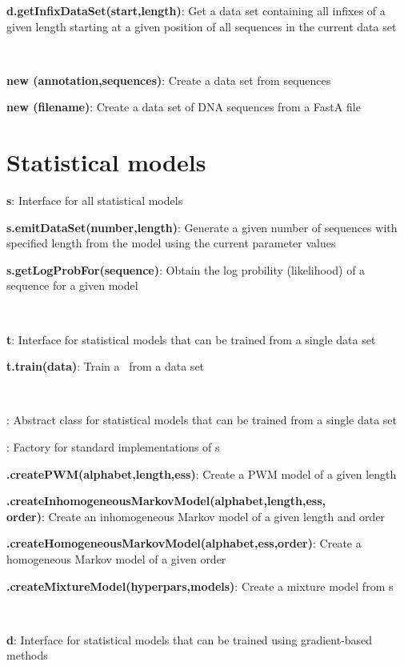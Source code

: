 \documentclass[10pt]{scrartcl}
\newcommand{\entry}[3]{{\bfseries #1#2}: #3}
\begin{document}
\begin{flushleft}
\entry{d}{.getInfixDataSet(start,length)}{Get a data set containing all infixes of a given length starting at a given position of all sequences in the current data set}

~

\entry{new \DataSet}{(annotation,sequences)}{Create a data set from sequences}

\entry{new \DNADataSet}{(filename)}{Create a data set of DNA sequences from a FastA file}

\section{Statistical models}

\entry{\StatMod}{ s}{Interface for all statistical models}

\entry{s}{.emitDataSet(number,length)}{Generate a given number of sequences with specified length from the model using the current parameter values}

\entry{s}{.getLogProbFor(sequence)}{Obtain the log probility (likelihood) of a sequence for a given model}

~

\entry{\TrainSM}{ t}{Interface for statistical models that can be trained from a single data set}

\entry{t}{.train(data)}{Train a \TrainSM~from a data set}

~

\entry{\AbstractTrainSM}{}{Abstract class for statistical models that can be trained from a single data set}

\entry{\TrainSMFactory}{}{Factory for standard implementations of \TrainSM s}

\entry{\TrainSMFactory}{.createPWM(alphabet,length,ess)}{Create a PWM model of a given length}

\entry{\TrainSMFactory}{.createInhomogeneousMarkovModel(alphabet,length,ess,\\order)}{Create an inhomogeneous Markov model of a given length and order}

\entry{\TrainSMFactory}{.createHomogeneousMarkovModel(alphabet,ess,order)}{Create a homogeneous Markov model of a given order}

\entry{\TrainSMFactory}{.createMixtureModel(hyperpars,models)}{Create a mixture model from \TrainSM s}

~

\entry{\DiffSM}{ d}{Interface for statistical models that can be trained using gradient-based methods}


\end{flushleft}
\end{document}
